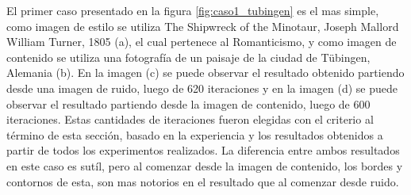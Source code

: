 \documentclass[a4paper,11pt,spanish]{book}
\begin{document}
      El primer caso presentado en la figura \ref{fig:caso1_tubingen} es el mas simple, como imagen de estilo se utiliza The Shipwreck of the Minotaur, Joseph Mallord William Turner, 1805 (a),
      el cual pertenece al Romanticismo, y como imagen de contenido se utiliza una fotografía de un paisaje de la ciudad de T\"{u}bingen, Alemania (b).
      En la imagen (c) se puede observar el resultado obtenido partiendo desde una imagen de ruido, luego de 620 iteraciones y en la imagen (d) se puede observar el resultado partiendo desde
      la imagen de contenido, luego de 600 iteraciones.
      Estas cantidades de iteraciones fueron elegidas con el criterio al término de esta sección, basado en la experiencia y los resultados obtenidos a partir de todos 
      los experimentos realizados.
      La diferencia entre ambos resultados en este caso es sutíl, pero al comenzar desde la imagen de contenido, los bordes y contornos de esta, son mas notorios en el resultado
      que al comenzar desde ruido.
\end{document}
